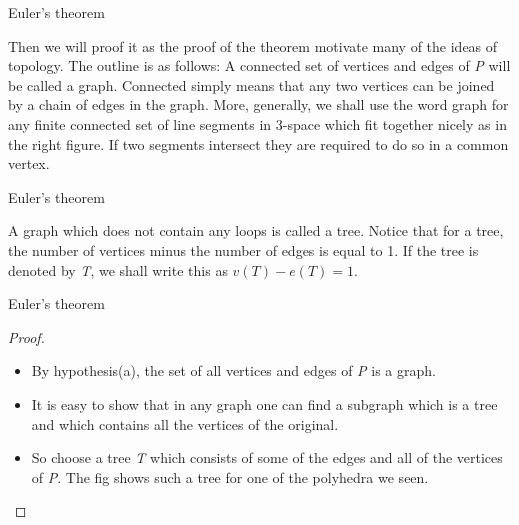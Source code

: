 \documentclass{beamer}
\begin{document}
\begin{frame}{Euler's theorem}
  \begin{definition}[Graph]
    Then we will proof it as the proof of the theorem motivate many of the ideas of topology. The outline is as follows: A connected set of vertices and edges of \textsl{P} will be called a graph. Connected simply means that any two vertices can be joined by a chain of edges in the graph. More, generally, we shall use the word graph for any finite connected set of line segments in 3-space which fit together nicely as in the right figure. If two segments intersect they are required to do so in a common vertex.
  \end{definition}
\end{frame}

\begin{frame}{Euler's theorem}
  \begin{definition}[Tree]
    A graph which does not contain any loops is called a tree. Notice that for a tree, the number of vertices minus the number of edges is equal to 1. If the tree is denoted by \textsl{T}, we shall write this as $v(T) - e(T) = 1$.
  \end{definition}
\end{frame}

\begin{frame}{Euler's theorem}
  \begin{proof}
    \begin{itemize}
    \item By hypothesis(a), the set of all vertices and edges of \textsl{P} is a graph.
    \item It is easy to show that in any graph one can find a subgraph which is a tree and which contains all the vertices of the original.
    \item So choose a tree \textsl{T} which consists of some of the edges and all of the vertices of \textsl{P}. The fig shows such a tree for one of the polyhedra we seen.
    \end{itemize}
  \end{proof}
\end{frame}
\end{document}
